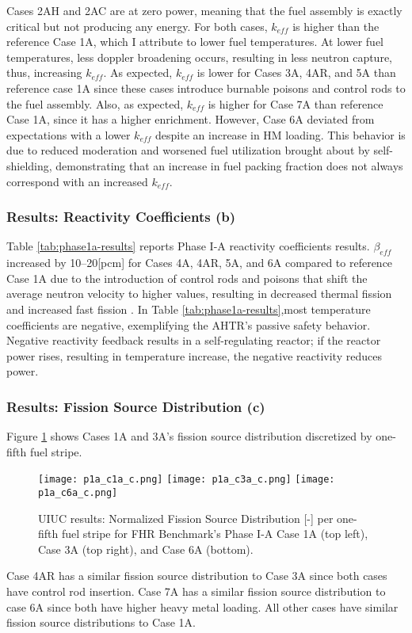 Cases 2AH and 2AC are at zero power, meaning that the fuel assembly is exactly 
critical but not producing any energy. 
For both cases, $k_{eff}$ is higher than the reference Case 1A, which I attribute to 
lower fuel temperatures. 
At lower fuel temperatures, less doppler broadening occurs, resulting in less neutron 
capture, thus, increasing $k_{eff}$. 
As expected, $k_{eff}$ is lower for Cases 3A, 4AR, and 5A than reference case 
1A since these cases introduce burnable poisons and control rods to the fuel 
assembly. 
Also, as expected, $k_{eff}$ is higher for Case 7A than reference Case 1A, since 
it has a higher enrichment. 
However, Case 6A deviated from expectations with a lower $k_{eff}$ despite an increase 
in \acrlong{HM} loading. 
This behavior is due to reduced moderation and worsened fuel utilization brought about 
by self-shielding, demonstrating that an increase in fuel packing fraction does not 
always correspond with an increased $k_{eff}$. 

\subsubsection{Results: Reactivity Coefficients (b)}
Table \ref{tab:phase1a-results} reports Phase I-A reactivity coefficients results. 
$\beta_{eff}$ increased by 10--20[pcm] for Cases 4A, 4AR, 5A, and 6A compared to
reference Case 1A due to the introduction of control rods and poisons that 
shift the average neutron velocity to higher values, resulting in decreased
thermal fission and increased fast fission \cite{torabi_neutronic_2018}.
In Table \ref{tab:phase1a-results},most temperature coefficients are negative, 
exemplifying the \gls{AHTR}'s passive safety behavior. 
Negative reactivity feedback results in a self-regulating reactor; if the reactor 
power rises, resulting in temperature increase, the negative reactivity
reduces power. 

\subsubsection{Results: Fission Source Distribution (c)}
Figure \ref{fig:phase1a-c} shows Cases 1A and 3A's fission source distribution 
discretized by one-fifth fuel stripe. 
\begin{figure}[htbp]
    \centering
    \texttt{[image: p1a\_c1a\_c.png]} 
    \texttt{[image: p1a\_c3a\_c.png]} 
    \texttt{[image: p1a\_c6a\_c.png]} 
    \caption{\acrlong{UIUC} results: Normalized Fission Source Distribution [-] 
    per one-fifth fuel stripe for \acrlong{FHR} Benchmark's Phase I-A Case 1A 
    (top left), Case 3A (top right), and Case 6A (bottom).}
    \label{fig:phase1a-c}
\end{figure}
Case 4AR has a similar fission source distribution to Case 3A since both 
cases have control rod insertion. 
Case 7A has a similar fission source distribution to case 6A since both have 
higher heavy metal loading. 
All other cases have similar fission source distributions to Case 1A. 

